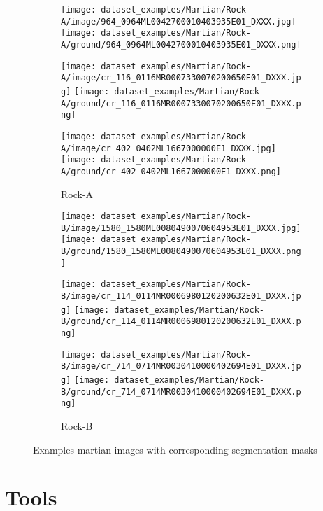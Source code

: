 \documentclass[a4paper,twoside,12pt]{book}
\begin{document}
\begin{figure}[!h]
    \centering
    \begin{subfigure}[b]{0.4\textwidth}
        \centering
        \texttt{[image: dataset\_examples/Martian/Rock-A/image/964\_0964ML0042700010403935E01\_DXXX.jpg]}
        \texttt{[image: dataset\_examples/Martian/Rock-A/ground/964\_0964ML0042700010403935E01\_DXXX.png]}

        \texttt{[image: dataset\_examples/Martian/Rock-A/image/cr\_116\_0116MR0007330070200650E01\_DXXX.jpg]}
        \texttt{[image: dataset\_examples/Martian/Rock-A/ground/cr\_116\_0116MR0007330070200650E01\_DXXX.png]}

        \texttt{[image: dataset\_examples/Martian/Rock-A/image/cr\_402\_0402ML1667000000E1\_DXXX.jpg]}
        \texttt{[image: dataset\_examples/Martian/Rock-A/ground/cr\_402\_0402ML1667000000E1\_DXXX.png]}

        \caption{Rock-A}
        \label{fig:rocka_martian_example}
    \end{subfigure}
    \begin{subfigure}[b]{0.4\textwidth}
        \centering
        \texttt{[image: dataset\_examples/Martian/Rock-B/image/1580\_1580ML0080490070604953E01\_DXXX.jpg]}
        \texttt{[image: dataset\_examples/Martian/Rock-B/ground/1580\_1580ML0080490070604953E01\_DXXX.png]}


        \texttt{[image: dataset\_examples/Martian/Rock-B/image/cr\_114\_0114MR0006980120200632E01\_DXXX.jpg]}
        \texttt{[image: dataset\_examples/Martian/Rock-B/ground/cr\_114\_0114MR0006980120200632E01\_DXXX.png]}

        \texttt{[image: dataset\_examples/Martian/Rock-B/image/cr\_714\_0714MR0030410000402694E01\_DXXX.jpg]}
        \texttt{[image: dataset\_examples/Martian/Rock-B/ground/cr\_714\_0714MR0030410000402694E01\_DXXX.png]}

        \caption{Rock-B}
        \label{fig:rockb_martian_example}
    \end{subfigure}
\caption{Examples martian images with corresponding segmentation masks}
\label{fig:martian_dataset_examples}
\end{figure}

\section{Tools}


\end{document}
